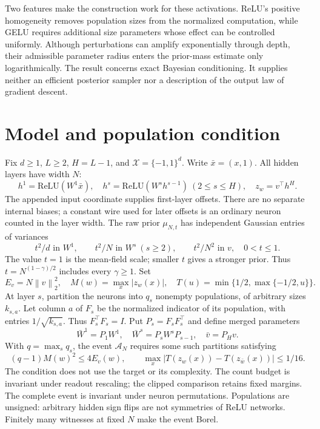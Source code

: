 \documentclass[11pt]{article}
\newcommand{\norm}[1]{\left\|#1\right\|}
\newcommand{\relu}{\mathrm{ReLU}}
\begin{document}
Two features make the construction work for these activations. ReLU's positive homogeneity removes population sizes from the normalized computation, while GELU requires additional size parameters whose effect can be controlled uniformly. Although perturbations can amplify exponentially through depth, their admissible parameter radius enters the prior-mass estimate only logarithmically. The result concerns exact Bayesian conditioning. It supplies neither an efficient posterior sampler nor a description of the output law of gradient descent.

\section{Model and population condition}
Fix $d\ge1$, $L\ge2$, $H=L-1$, and $\mathcal X=\{-1,1\}^d$. Write $\bar x=(x,1)$. All hidden layers have width $N$:
\[
 h^1=\relu(W^1\bar x),\quad h^s=\relu(W^sh^{s-1})\ (2\le s\le H),\quad z_w=v^\top h^H.
\]
The appended input coordinate supplies first-layer offsets. There are no separate internal biases; a constant wire used for later offsets is an ordinary neuron counted in the layer width. The raw prior $\mu_{N,t}$ has independent Gaussian entries of variances
\[
 t^2/d\text{ in }W^1,\qquad t^2/N\text{ in }W^s\ (s\ge2),\qquad t^2/N^2\text{ in }v,\quad0<t\le1.
\]
The value $t=1$ is the mean-field scale; smaller $t$ gives a stronger prior. Thus $t=N^{(1-\gamma)/2}$ includes every $\gamma\ge1$. Set
\[
 E_v=N\norm v_2^2,\quad M(w)=\max_x|z_w(x)|,\quad T(u)=\min\{1/2,\max\{-1/2,u\}\}.
\]
At layer $s$, partition the neurons into $q_s$ nonempty populations, of arbitrary sizes $k_{s,a}$. Let column $a$ of $F_s$ be the normalized indicator of its population, with entries $1/\sqrt{k_{s,a}}$. Thus $F_s^\top F_s=I$. Put $P_s=F_sF_s^\top$ and define merged parameters
\[
 \bar W^1=P_1W^1,\quad \bar W^s=P_sW^sP_{s-1},\quad \bar v=P_Hv.
\]
With $q=\max_s q_s$, the event $\mathcal A_N$ requires some such partitions satisfying
\begin{equation}\label{eq:condition}
 (q-1)M(w)^2\le4E_v(w),\qquad \max_x|T(z_w(x))-T(z_{\bar w}(x))|\le1/16.
\end{equation}
The condition does not use the target or its complexity. The count budget is invariant under readout rescaling; the clipped comparison retains fixed margins. The complete event is invariant under neuron permutations. Populations are unsigned: arbitrary hidden sign flips are not symmetries of ReLU networks. Finitely many witnesses at fixed $N$ make the event Borel.
\end{document}
